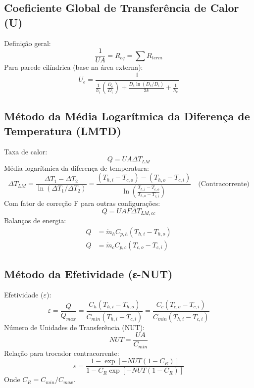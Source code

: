 \documentclass[12pt, a4paper]{article}
\begin{document}
\subsection{Coeficiente Global de Transferência de Calor (U)}
Definição geral:
\begin{equation}
    \frac{1}{UA} = R_{eq} = \sum R_{term}
\end{equation}
Para parede cilíndrica (base na área externa):
\begin{equation}
    U_e = \frac{1}{\frac{1}{h_i}\left(\frac{D_e}{D_i}\right) + \frac{D_e \ln(D_e/D_i)}{2k} + \frac{1}{h_e}}
\end{equation}

\subsection{Método da Média Logarítmica da Diferença de Temperatura (LMTD)}
Taxa de calor:
\begin{equation}
    Q = UA \Delta T_{LM}
\end{equation}
Média logarítmica da diferença de temperatura:
\begin{equation}
    \Delta T_{LM} = \frac{\Delta T_1 - \Delta T_2}{\ln(\Delta T_1 / \Delta T_2)} = \frac{(T_{h,i} - T_{c,o}) - (T_{h,o} - T_{c,i})}{\ln\left(\frac{T_{h,i} - T_{c,o}}{T_{h,o} - T_{c,i}}\right)} \quad \text{(Contracorrente)}
\end{equation}
Com fator de correção F para outras configurações:
\begin{equation}
    Q = U A F \Delta T_{LM, cc}
\end{equation}
Balanços de energia:
\begin{align*}
    Q &= \dot{m}_h C_{p,h} (T_{h,i} - T_{h,o}) \\
    Q &= \dot{m}_c C_{p,c} (T_{c,o} - T_{c,i})
\end{align*}

\subsection{Método da Efetividade (ε-NUT)}
Efetividade ($\varepsilon$):
\begin{equation}
    \varepsilon = \frac{Q}{Q_{max}} = \frac{C_h(T_{h,i} - T_{h,o})}{C_{min}(T_{h,i} - T_{c,i})} = \frac{C_c(T_{c,o} - T_{c,i})}{C_{min}(T_{h,i} - T_{c,i})}
\end{equation}
Número de Unidades de Transferência (NUT):
\begin{equation}
    NUT = \frac{UA}{C_{min}}
\end{equation}
Relação para trocador contracorrente:
\begin{equation}
    \varepsilon = \frac{1 - \exp[-NUT(1-C_R)]}{1 - C_R \exp[-NUT(1-C_R)]}
\end{equation}
Onde $C_R = C_{min}/C_{max}$.
\end{document}
